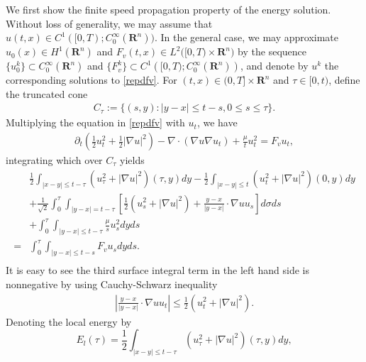 \documentclass[review]{elsarticle}
\newcommand{\R}{\mathbf{R}}
\begin{document}
We first show the finite speed propagation property of the energy solution. Without loss of generality, we may assume that $u(t, x)\in C^1([0, T); C_0^\infty(\R^n))$. In the general case, we may approximate $u_0(x)\in H^1(\R^n)$ and $F_v(t, x)\in L^2\big([0, T)\times\R^n\big)$ by the sequence $\{u_0^k\}\subset C_0^\infty(\R^n)$ and $\{F_v^k\}\subset C^1\left([0, T); C_0^\infty(\R^n)\right)$, and denote by $u^k$ the corresponding solutions to \eqref{repdfv}. For $(t, x)\in (0, T]\times \R^n$ and $\tau\in [0, t)$, define the truncated cone
\begin{equation}\label{cx0t0}
\begin{aligned}
C_{\tau}:=\Big\{(s, y): |y-x|\le t-s, 0\le s\leq\tau\Big\}.
\end{aligned}
\end{equation}
Multiplying the equation in \eqref{repdfv} with $u_t$, we have
\begin{equation}\label{M1}
\begin{aligned}
\partial_t\left(\frac12u_t^2+\frac12|\nabla u|^2\right)-\nabla\cdot(\nabla u\nabla u_t)+\frac{\mu}{t}u_t^2=F_vu_t,
\end{aligned}
\end{equation}
integrating which over $C_\tau$ yields
\begin{equation}\label{M2}
\begin{aligned}
&\frac12\int_{|x-y|\le t-\tau}\left(u_\tau^2+|\nabla u|^2\right)(\tau, y)dy-\frac12\int_{|x-y|\le t}\left(u_t^2+|\nabla u|^2\right)(0, y)dy\\
&+\frac1{\sqrt 2}\int_0^\tau\int_{|y-x|=t-\tau}\left[\frac12\left(u_s^2+|\nabla u|^2\right)+\frac{y-x}{|y-x|}\cdot\nabla uu_s\right]d\sigma ds\\
&+\int_0^\tau\int_{|y-x|\le t-\tau}\frac{\mu}{s}u_s^2 dyds\\
=&\int_0^\tau\int_{|y-x|\le t-s}F_vu_s dy ds.\\
\end{aligned}
\end{equation}
It is easy to see the third surface integral term in the left hand side is nonnegative by using Cauchy-Schwarz inequality
\begin{equation}\label{M3}
\begin{aligned}
\left|\frac{y-x}{|y-x|}\cdot\nabla uu_t\right|\le \frac12\left(u_t^2+|\nabla u|^2\right).
\end{aligned}
\end{equation}
Denoting the local energy by
\[
E_l(\tau)=\frac12\int_{|x-y|\le t-\tau}\left(u_\tau^2+|\nabla u|^2\right)(\tau, y)dy,
\]
\end{document}

